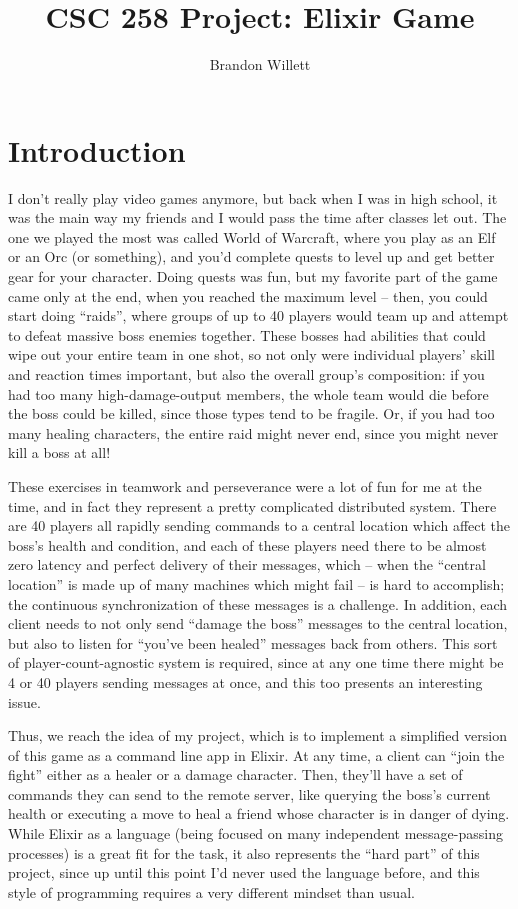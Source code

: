 \documentclass[letterpaper]{article}
\title{CSC 258 Project: Elixir Game}
\author{Brandon Willett}
\begin{document}
	\maketitle

	\section{Introduction}

	I don't really play video games anymore, but back when I was in high school, it was the main way my friends and I would pass the time after classes let out. The one we played the most was called World of Warcraft, where you play as an Elf or an Orc (or something), and you'd complete quests to level up and get better gear for your character. Doing quests was fun, but my favorite part of the game came only at the end, when you reached the maximum level -- then, you could start doing ``raids'', where groups of up to 40 players would team up and attempt to defeat massive boss enemies together. These bosses had abilities that could wipe out your entire team in one shot, so not only were individual players' skill and reaction times important, but also the overall group's composition: if you had too many high-damage-output members, the whole team would die before the boss could be killed, since those types tend to be fragile. Or, if you had too many healing characters, the entire raid might never end, since you might never kill a boss at all!

	These exercises in teamwork and perseverance were a lot of fun for me at the time, and in fact they represent a pretty complicated distributed system. There are 40 players all rapidly sending commands to a central location which affect the boss's health and condition, and each of these players need there to be almost zero latency and perfect delivery of their messages, which -- when the ``central location'' is made up of many machines which might fail -- is hard to accomplish; the continuous synchronization of these messages is a challenge. In addition, each client needs to not only send ``damage the boss'' messages to the central location, but also to listen for ``you've been healed'' messages back from others. This sort of player-count-agnostic system is required, since at any one time there might be 4 or 40 players sending messages at once, and this too presents an interesting issue.

	Thus, we reach the idea of my project, which is to implement a simplified version of this game as a command line app in Elixir. At any time, a client can ``join the fight'' either as a healer or a damage character. Then, they'll have a set of commands they can send to the remote server, like querying the boss's current health or executing a move to heal a friend whose character is in danger of dying. While Elixir as a language (being focused on many independent message-passing processes) is a great fit for the task, it also represents the ``hard part'' of this project, since up until this point I'd never used the language before, and this style of programming requires a very different mindset than usual.
\end{document}

